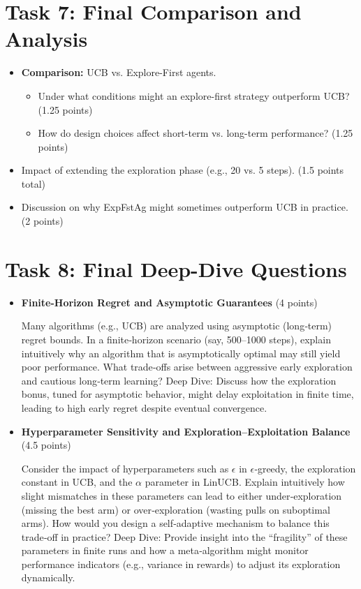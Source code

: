 \documentclass[12pt]{article}
\begin{document}
{{{\section{Task 7: Final Comparison and Analysis}
\begin{itemize}[noitemsep]
    \item \textbf{Comparison:} UCB vs. Explore-First agents.
    \begin{itemize}[noitemsep]
        \item Under what conditions might an explore-first strategy outperform UCB? (1.25 points)
        \item How do design choices affect short-term vs. long-term performance? (1.25 points)
    \end{itemize}
    \item Impact of extending the exploration phase (e.g., 20 vs. 5 steps). (1.5 points total)
    \item Discussion on why ExpFstAg might sometimes outperform UCB in practice. (2 points)
\end{itemize}

\section{Task 8: Final Deep-Dive Questions}
\begin{itemize}[noitemsep]
    \item \textbf{Finite-Horizon Regret and Asymptotic Guarantees} (4 points)
    
    \vspace{0.25cm}
    Many algorithms (e.g., UCB) are analyzed using asymptotic (long‑term) regret bounds. In a finite‑horizon scenario (say, 500–1000 steps), explain intuitively why an algorithm that is asymptotically optimal may still yield poor performance. What trade‑offs arise between aggressive early exploration and cautious long‑term learning?
    Deep Dive:
    Discuss how the exploration bonus, tuned for asymptotic behavior, might delay exploitation in finite time, leading to high early regret despite eventual convergence.
    \vspace{0.5cm}
    \item \textbf{Hyperparameter Sensitivity and Exploration–Exploitation Balance} (4.5 points)

    \vspace{0.25cm}
    Consider the impact of hyperparameters such as $\epsilon$ in $\epsilon$‑greedy, the exploration constant in UCB, and the $\alpha$ parameter in LinUCB. Explain intuitively how slight mismatches in these parameters can lead to either under‑exploration (missing the best arm) or over‑exploration (wasting pulls on suboptimal arms). How would you design a self‑adaptive mechanism to balance this trade‑off in practice?
    Deep Dive:
    Provide insight into the “fragility” of these parameters in finite runs and how a meta‑algorithm might monitor performance indicators (e.g., variance in rewards) to adjust its exploration dynamically.
    \vspace{0.5cm}
    

\end{itemize}}}}
\end{document}
